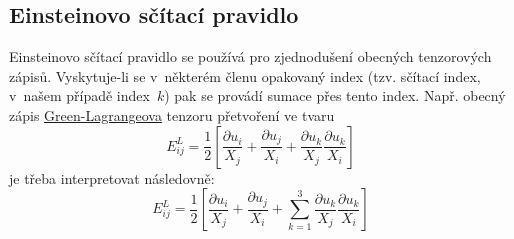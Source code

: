 
\subsection{Einsteinovo sčítací pravidlo}\label{sec:einsteinovo-scitaci-pravidlo}
Einsteinovo sčítací pravidlo se používá pro zjednodušení obecných tenzorových zápisů. Vyskytuje-li se v~některém členu opakovaný index (tzv. sčítací index, v~našem případě index~$k$) pak se provádí sumace přes tento index. Např. obecný zápis \hyperref[sec:green-lagrange]{Green-Lagrangeova} tenzoru přetvoření ve tvaru
\begin{equation}
	E^L_{ij} = \frac{1}{2} \left[ \frac{\partial u_i}{X_j} + \frac{\partial u_j}{X_i} + \frac{\partial u_k}{X_j} \frac{\partial u_k}{X_i} \right]
\end{equation}
je třeba interpretovat následovně:
\begin{equation}
	E^L_{ij} = \frac{1}{2} \left[ \frac{\partial u_i}{X_j} + \frac{\partial u_j}{X_i} + \sum_{k=1}^3 \frac{\partial u_k}{X_j} \frac{\partial u_k}{X_i} \right]
\end{equation}
